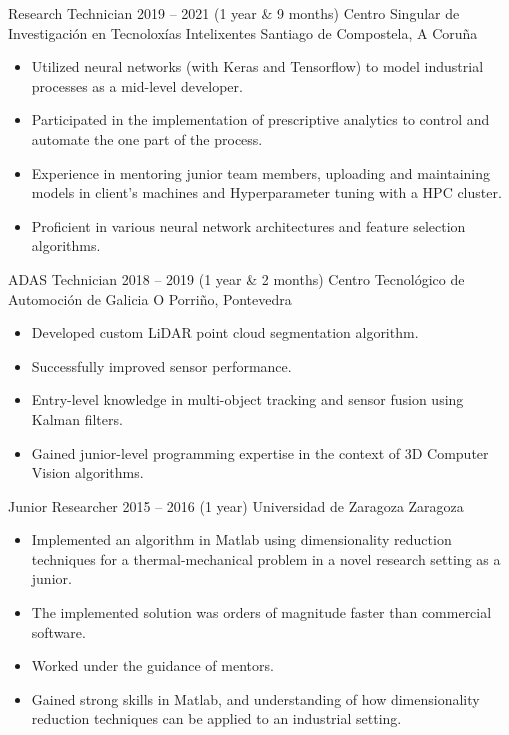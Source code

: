 \documentclass[a4]{article}
\begin{document}
\vspace{12pt}%
\cvitem
    {Research Technician}
    {2019 -- 2021 (1 year \& 9 months)}
    {Centro Singular de Investigación en Tecnoloxías Intelixentes}
    {Santiago de Compostela, A Coruña}
\begin{itemize}
  \item Utilized neural networks (with Keras and Tensorflow) to model
industrial processes as a mid-level developer.\item Participated in the
implementation of prescriptive analytics to control and automate the one
part of the process.\item Experience in mentoring junior team members,
uploading and maintaining models in client's machines and Hyperparameter
tuning with a HPC cluster.\item Proficient in various neural network
architectures and feature selection algorithms.
\end{itemize}

\vspace{12pt}%
\cvitem
    {ADAS Technician}
    {2018 -- 2019 (1 year \& 2 months)}
    {Centro Tecnológico de Automoción de Galicia}
    {O Porriño, Pontevedra}
\begin{itemize}
  \item Developed custom LiDAR point cloud segmentation
algorithm.\item Successfully improved sensor
performance.\item Entry-level knowledge in multi-object tracking and
sensor fusion using Kalman filters.\item Gained junior-level
\Cpp programming expertise in the context of 3D Computer Vision
algorithms.
\end{itemize}

\vspace{12pt}%
\cvitem
    {Junior Researcher}
    {2015 -- 2016 (1 year)}
    {Universidad de Zaragoza}
    {Zaragoza}
\begin{itemize}
  \item Implemented an algorithm in Matlab using dimensionality
reduction techniques for a thermal-mechanical problem in a novel
research setting as a junior.\item The implemented solution was orders
of magnitude faster than commercial software.\item Worked under the
guidance of mentors.\item Gained strong skills in Matlab, and
understanding of how dimensionality reduction techniques can be applied
to an industrial setting.
\end{itemize}
\end{document}
